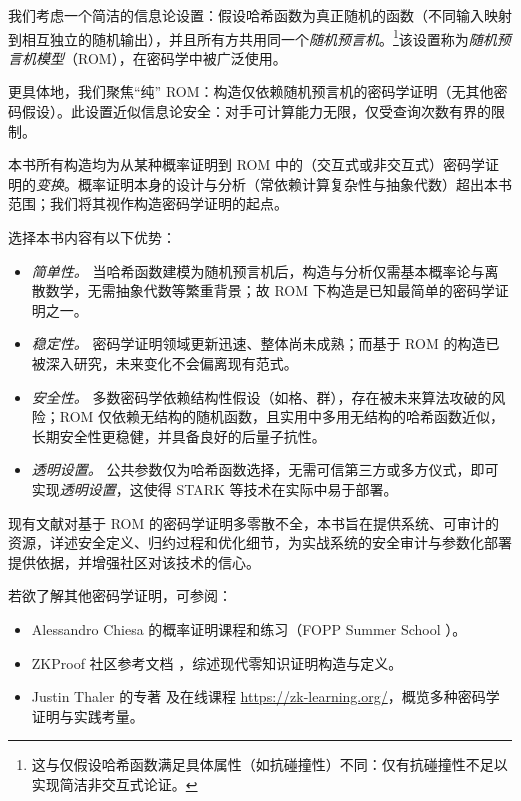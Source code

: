 \documentclass[american,singlepageview]{snargs-book-zh}
\begin{document}
我们考虑一个简洁的信息论设置：假设哈希函数为真正随机的函数（不同输入映射到相互独立的随机输出），并且所有方共用同一个\emph{随机预言机}。\footnote{这与仅假设哈希函数满足具体属性（如抗碰撞性）不同：仅有抗碰撞性不足以实现简洁非交互式论证。}该设置称为\emph{随机预言机模型}（ROM），在密码学中被广泛使用。

更具体地，我们聚焦“纯” ROM：构造仅依赖随机预言机的密码学证明（无其他密码假设）。此设置近似信息论安全：对手可计算能力无限，仅受查询次数有界的限制。

本书所有构造均为从某种概率证明到 ROM 中的（交互式或非交互式）密码学证明的\emph{变换}。概率证明本身的设计与分析（常依赖计算复杂性与抽象代数）超出本书范围；我们将其视作构造密码学证明的起点。

选择本书内容有以下优势：
\begin{itemize}[noitemsep]
  \item \emph{简单性。} 当哈希函数建模为随机预言机后，构造与分析仅需基本概率论与离散数学，无需抽象代数等繁重背景；故 ROM 下构造是已知最简单的密码学证明之一。
  \item \emph{稳定性。} 密码学证明领域更新迅速、整体尚未成熟；而基于 ROM 的构造已被深入研究，未来变化不会偏离现有范式。
  \item \emph{安全性。} 多数密码学依赖结构性假设（如格、群），存在被未来算法攻破的风险；ROM 仅依赖无结构的随机函数，且实用中多用无结构的哈希函数近似，长期安全性更稳健，并具备良好的后量子抗性。
  \item \emph{透明设置。} 公共参数仅为哈希函数选择，无需可信第三方或多方仪式，即可实现\emph{透明设置}，这使得 STARK 等技术在实际中易于部署。
\end{itemize}

现有文献对基于 ROM 的密码学证明多零散不全，本书旨在提供系统、可审计的资源，详述安全定义、归约过程和优化细节，为实战系统的安全审计与参数化部署提供依据，并增强社区对该技术的信心。

若欲了解其他密码学证明，可参阅：
\begin{itemize}[noitemsep]
  \item Alessandro Chiesa 的概率证明课程和练习（FOPP Summer School \cite{FOPPSummer21,FOPPSummer23}）。
  \item ZKProof 社区参考文档 \cite{ZKProof}，综述现代零知识证明构造与定义。
  \item Justin Thaler 的专著 \cite{ThalerBook} 及在线课程 \url{https://zk-learning.org/}，概览多种密码学证明与实践考量。
\end{itemize}
\end{document}
